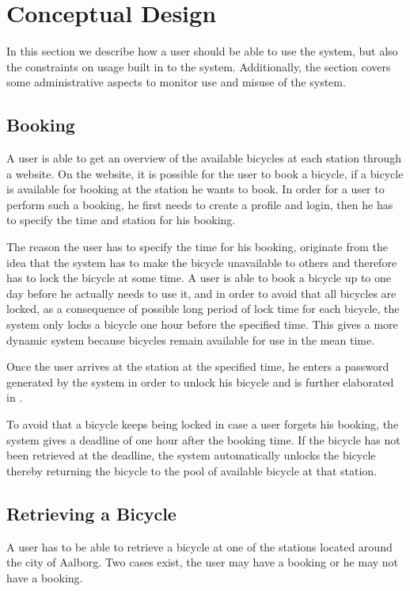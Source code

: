 \section{Conceptual Design}
In this section we describe how a user should be able to use the system, but also the constraints on usage built in to the system.
Additionally, the section covers some administrative aspects to monitor use and misuse of the system.

\subsection{Booking}
A user is able to get an overview of the available bicycles at each station through a website. 
On the website, it is possible for the user to book a bicycle, if a bicycle is available for booking at the station he wants to book. 
In order for a user to perform such a booking, he first needs to create a profile and login, then he has to specify the time and station for his booking.

The reason the user has to specify the time for his booking, originate from the idea that the system has to make the bicycle unavailable to others and therefore has to lock the bicycle at some time.
A user is able to book a bicycle up to one day before he actually needs to use it, and in order to avoid that all bicycles are locked, as a consequence of possible long period of lock time for each bicycle, the system only locks a bicycle one hour before the specified time.
This gives a more dynamic system because bicycles remain available for use in the mean time.

Once the user arrives at the station at the specified time, he enters a password generated by the system in order to unlock his bicycle and is further elaborated in .

To avoid that a bicycle keeps being locked in case a user forgets his booking, the system gives a deadline of one hour after the booking time.
If the bicycle has not been retrieved at the deadline, the system automatically unlocks the bicycle thereby returning the bicycle to the pool of available bicycle at that station. 

\subsection{Retrieving a Bicycle}\label{sec:conceptretrieveandshit}
A user has to be able to retrieve a bicycle at one of the stations located around the city of Aalborg.
Two cases exist, the user may have a booking or he may not have a booking.

